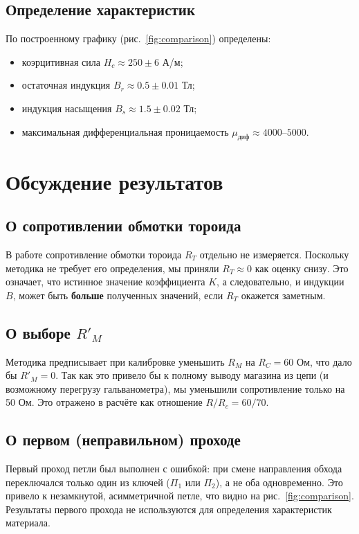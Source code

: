 \documentclass[a4paper]{article}
\begin{document}
\subsection{Определение характеристик}

По построенному графику (рис.~\ref{fig:comparison}) определены:
\begin{itemize}
	\item коэрцитивная сила $H_c \approx 250 \pm 6$ А/м;
	\item остаточная индукция $B_r \approx 0.5 \pm 0.01$ Тл;
	\item индукция насыщения $B_s \approx 1.5 \pm 0.02$ Тл;
	\item максимальная дифференциальная проницаемость $\mu_{\text{диф}} \approx 4000$--$5000$.
\end{itemize}

\section{Обсуждение результатов}

\subsection{О сопротивлении обмотки тороида}

В работе сопротивление обмотки тороида $R_T$ отдельно не измеряется. Поскольку методика не требует его определения, мы приняли $R_T \approx 0$ как оценку снизу. Это означает, что истинное значение коэффициента $K$, а следовательно, и индукции $B$, может быть \textbf{больше} полученных значений, если $R_T$ окажется заметным.

\subsection{О выборе $R'_M$}

Методика предписывает при калибровке уменьшить $R_M$ на $R_C = 60$ Ом, что дало бы $R'_M = 0$. Так как это привело бы к полному выводу магазина из цепи (и возможному перегрузу гальванометра), мы уменьшили сопротивление только на 50 Ом. Это отражено в расчёте как отношение $R/R_c = 60/70$.

\subsection{О первом (неправильном) проходе}

Первый проход петли был выполнен с ошибкой: при смене направления обхода переключался только один из ключей ($\Pi_1$ или $\Pi_2$), а не оба одновременно. Это привело к незамкнутой, асимметричной петле, что видно на рис.~\ref{fig:comparison}. Результаты первого прохода не используются для определения характеристик материала.
\end{document}
